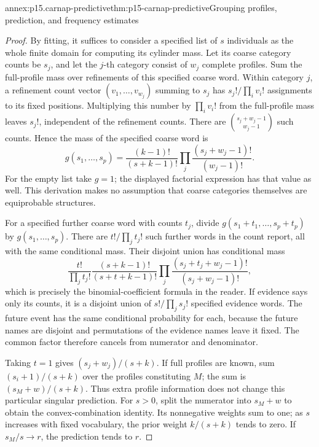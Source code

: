 \begin{annexitem}{annex:p15.carnap-predictive}{thm:p15-carnap-predictive}{Grouping profiles, prediction, and frequency estimates}
\begin{proof}
By fitting, it suffices to consider a specified list of \(s\)
individuals as the whole finite domain for computing its cylinder mass.
Let its coarse category counts be \(s_j\), and let the \(j\)-th
category consist of \(w_j\) complete profiles. Sum the full-profile
mass over refinements of this specified coarse word. Within category
\(j\), a refinement count vector \((v_1,\ldots,v_{w_j})\)
summing to \(s_j\) has \(s_j!/\prod_i v_i!\) assignments to
its fixed positions. Multiplying this number by \(\prod_i v_i!\)
from the full-profile mass leaves \(s_j!\), independent of the
refinement counts. There are \(\binom{s_j+w_j-1}{w_j-1}\)
such counts. Hence the mass of the specified coarse word is
\[
 g(s_1,\ldots,s_p)
 =\frac{(k-1)!}{(s+k-1)!}
   \prod_j\frac{(s_j+w_j-1)!}{(w_j-1)!}.
\]
For the empty list take \(g=1\); the displayed factorial expression
has that value as well. This derivation makes no assumption that coarse
categories themselves are equiprobable structures.

For a specified further coarse word with counts \(t_j\), divide
\(g(s_1+t_1,\ldots,s_p+t_p)\) by \(g(s_1,\ldots,s_p)\).
There are \(t!/\prod_j t_j!\) such further words in the count
report, all with the same conditional mass. Their disjoint union has
conditional mass
\[
 \frac{t!}{\prod_j t_j!}
 \frac{(s+k-1)!}{(s+t+k-1)!}
 \prod_j\frac{(s_j+t_j+w_j-1)!}{(s_j+w_j-1)!},
\]
which is precisely the binomial-coefficient formula in the reader.
If evidence says only its counts, it is a disjoint union of
\(s!/\prod_j s_j!\) specified evidence words. The future event
has the same conditional probability for each, because the future names
are disjoint and permutations of the evidence names leave it fixed.
The common factor therefore cancels from numerator and denominator.

Taking \(t=1\) gives \((s_j+w_j)/(s+k)\). If full profiles are
known, sum \((s_i+1)/(s+k)\) over the profiles constituting \(M\);
the sum is \((s_M+w)/(s+k)\). Thus extra profile information does
not change this particular singular prediction. For \(s>0\), split
the numerator into \(s_M+w\) to obtain the convex-combination
identity. Its nonnegative weights sum to one; as \(s\) increases
with fixed vocabulary, the prior weight \(k/(s+k)\) tends to zero.
If \(s_M/s\to r\), the prediction tends to \(r\).


\end{proof}
\end{annexitem}
